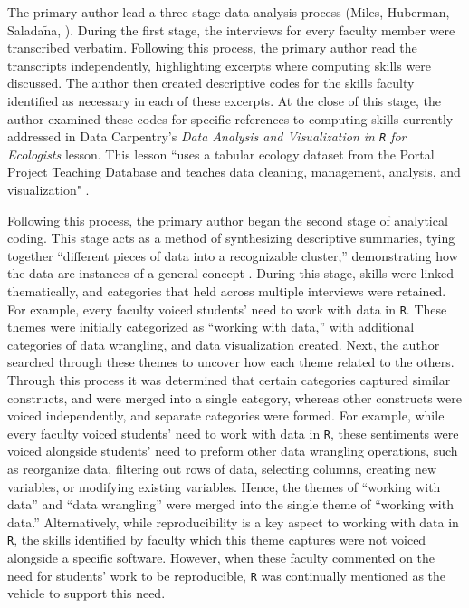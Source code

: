 \documentclass[12pt]{article}
\begin{document}
\quad The primary author lead a three-stage data analysis process (Miles, 
Huberman, Salada$\tilde{\text{n}}$a, \citeyear{miles}). During the first stage,
the interviews for every faculty member were transcribed verbatim. Following 
this process, the primary author read the transcripts independently, 
highlighting excerpts where computing skills were discussed. The author then 
created descriptive codes for the skills faculty identified as necessary in each
of these excerpts. At the close of this stage, the author examined these codes 
for specific references to computing skills currently addressed in Data 
Carpentry's \emph{Data Analysis and Visualization in \texttt{R} for Ecologists} 
lesson. This lesson ``uses a tabular ecology dataset from the Portal Project 
Teaching Database and teaches data cleaning, management, analysis, and 
visualization" \citep{ecology_curriculum}. 

\quad Following this process, the primary author began the second stage of 
analytical coding. This stage acts as a method of synthesizing descriptive 
summaries, tying together ``different pieces of data into a recognizable 
cluster,'' demonstrating how the data are instances of a general concept 
\citep[p. 95]{miles}. During this stage, skills were linked thematically, and 
categories that held across multiple interviews were retained. For example, 
every faculty voiced students' need to work with data in \texttt{R}. These 
themes were initially categorized as ``working with data,'' with additional 
categories of data wrangling, and data visualization created. Next, the author
searched through these themes to uncover how each theme related to the others.
Through this process it was determined that certain categories captured similar
constructs, and were merged into a single category, whereas other constructs
were voiced independently, and separate categories were formed. For example,
while every faculty voiced students' need to work with data in \texttt{R}, these
sentiments were voiced alongside students' need to preform other data wrangling
operations, such as reorganize data, filtering out rows of data, selecting
columns, creating new variables, or modifying existing variables. Hence, the
themes of ``working with data'' and ``data wrangling'' were merged into the
single theme of ``working with data.'' Alternatively, while reproducibility is
a key aspect to working with data in \texttt{R}, the skills identified by
faculty which this theme captures were not voiced alongside a specific software.
However, when these faculty commented on the need for students' work to be 
reproducible, \texttt{R} was continually mentioned as the vehicle to support 
this need. 
\end{document}
